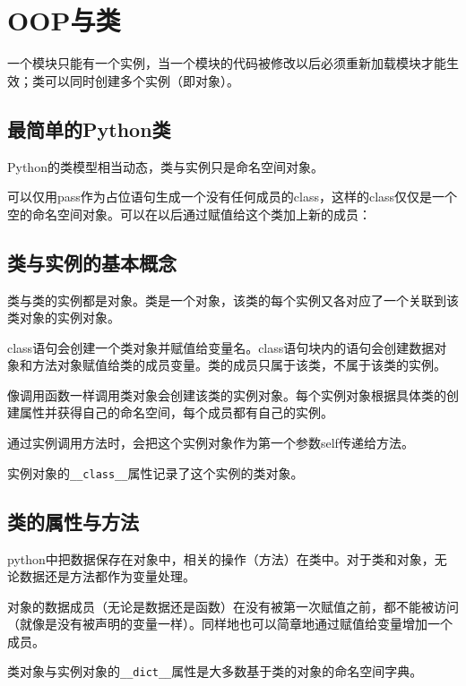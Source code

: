 \chapter{OOP与类}

	一个模块只能有一个实例，当一个模块的代码被修改以后必须重新加载模块才能生效；类可以同时创建多个实例（即对象）。

	\section{最简单的Python类}

		Python的类模型相当动态，类与实例只是命名空间对象。
		
		可以仅用pass作为占位语句生成一个没有任何成员的class，这样的class仅仅是一个空的命名空间对象。可以在以后通过赋值给这个类加上新的成员：

		


	\section{类与实例的基本概念}
		
		类与类的实例都是对象。类是一个对象，该类的每个实例又各对应了一个关联到该类对象的实例对象。
		
		class语句会创建一个类对象并赋值给变量名。class语句块内的语句会创建数据对象和方法对象赋值给类的成员变量。类的成员只属于该类，不属于该类的实例。

		像调用函数一样调用类对象会创建该类的实例对象。每个实例对象根据具体类的创建属性并获得自己的命名空间，每个成员都有自己的实例。

		通过实例调用方法时，会把这个实例对象作为第一个参数self传递给方法。

		实例对象的\verb|__class__|属性记录了这个实例的类对象。

		

	\section{类的属性与方法}

		python中把数据保存在对象中，相关的操作（方法）在类中。对于类和对象，无论数据还是方法都作为变量处理。

		对象的数据成员（无论是数据还是函数）在没有被第一次赋值之前，都不能被访问（就像是没有被声明的变量一样）。同样地也可以简章地通过赋值给变量增加一个成员。

		类对象与实例对象的\verb|__dict__|属性是大多数基于类的对象的命名空间字典。

